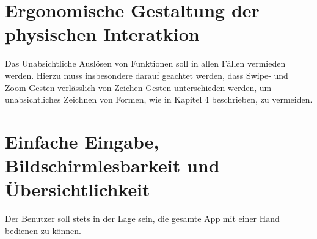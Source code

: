 \section{Ergonomische Gestaltung der physischen Interatkion}
Das Unabsichtliche Auslösen von Funktionen soll in allen Fällen vermieden werden.
Hierzu muss insbesondere darauf geachtet werden, dass Swipe- und Zoom-Gesten verlässlich von Zeichen-Gesten unterschieden werden, um unabsichtliches Zeichnen von Formen, wie in Kapitel 4 beschrieben, zu vermeiden.

\section{Einfache Eingabe, Bildschirmlesbarkeit und Übersichtlichkeit}
Der Benutzer soll stets in der Lage sein, die gesamte App mit einer Hand bedienen zu können.




